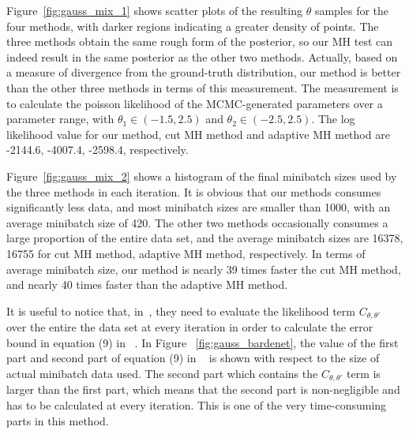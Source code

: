 \documentclass{article}
\begin{document}
Figure~\ref{fig:gauss_mix_1} shows scatter plots of the resulting $\theta$ samples for the four
methods, with darker regions indicating a greater density of points. The three methods obtain the
same rough form of the posterior, so our MH test can indeed result in the same posterior as the
other two methods. %
Actually, based on a measure of divergence from the ground-truth distribution, our method is better than the other three methods in terms of this measurement. The measurement is to calculate the poisson likelihood of the MCMC-generated parameters over a parameter range, with $\theta_1 \in (-1.5, 2.5)$ and $\theta_2 \in (-2.5, 2.5)$. The log likelihood value for our method, cut MH method and adaptive MH method are -2144.6, -4007.4, -2598.4, respectively. 

Figure~\ref{fig:gauss_mix_2} shows a histogram of the final minibatch sizes used by
the three methods in each iteration. It is obvious that our methods consumes significantly less data, and most minibatch sizes are smaller than 1000, with an average minibatch size of 420. The other two methods occasionally consumes a large proportion of the entire data set, and the average minibatch sizes are 16378, 16755 for cut MH method, adaptive MH method, respectively. In terms of average minibatch size, our method is nearly 39 times faster the cut MH method, and nearly 40 times faster than the adaptive MH method. 

It is useful to notice that, in~\cite{icml2014c1_bardenet14}, they need to evaluate the likelihood term $C_{\theta,\theta'}$ over the entire the data set at every iteration in order to calculate the error bound in equation (9) in ~\cite{icml2014c1_bardenet14}. In Figure ~\ref{fig:gauss_bardenet}, the value of the first part and second part of equation (9) in ~\cite{icml2014c1_bardenet14} is shown with respect to the size of actual minibatch data used. The second part which contains  the $C_{\theta,\theta'}$ term is larger than the first part, which means that the second part is non-negligible and has to be calculated at every iteration. This is one of the very time-consuming parts in this method. 
\end{document}
